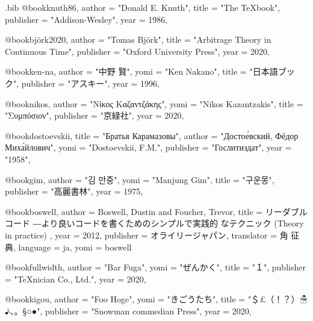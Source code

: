 
\begin{filecontents}[overwrite]{\jobname.bib}
@book{knuth86,
  author    = "Donald E. Knuth",
  title     = "The \TeX book",
  publisher = "Addison-Wesley",
  year      = 1986,
}

@book{björk2020,
  author    = "Tomas Björk",
  title     = "Arbitrage Theory in Continuous Time",
  publisher = "Oxford University Press",
  year      = 2020,
}

@book{ken-na,
  author    = "中野 賢",
  yomi      = "Ken Nakano",
  title     = "日本語{\LaTeXe}ブック",
  publisher = "アスキー",
  year      = 1996,
}

@book{nikos,
  author    = "Νίκος Καζαντζάκης",
  yomi      = "Nikos Kazantzakis",
  title     = "Συμπόσιον",
  publisher = "京緑社",
  year      = 2020,
}

@book{dostoevskii,
  title     = "Братья Карамазовы",
  author    = "Достое́вский, Фёдор Миха́йлович",
  yomi      = "Dostoevskii, F.M.",
  publisher = "Гослитиздат",
  year      = "1958",
}

@book{gim,
  author    = "김 만중",
  yomi      = "Manjung Gim",
  title     = "구운몽",
  publisher = "高麗書林",
  year      = 1975,
}

@book{boswell,
  author     = {Boswell, Dustin and Foucher, Trevor},
  title      = {リーダブルコード ―より良いコードを書くためのシンプルで実践的
                なテクニック (Theory in practice) },
  year       = 2012,
  publisher  = {オライリージャパン},
  translator = {角 征典},
  language   = {ja},
  yomi       = {boswell}
}

@book{fullwidth,
  author    = "Bar Fuga",
  yomi      = "ぜんかく",
  title     = "１",
  publisher = "TeXnician Co., Ltd.",
  year      = 2020,
}

@book{kigou,
  author    = "Foo Hoge",
  yomi      = "きごうたち",
  title     = "＄£（！？）☃♪、。§○●",
  publisher = "Snowman commedian Press",
  year      = 2020,
}
\end{filecontents}

\documentclass{ltjsarticle}
\usepackage{luatexja-fontspec}
\usepackage[sourcehan]{luatexja-preset}
\setmainfont{XITS}%

test
\nocite{*}



